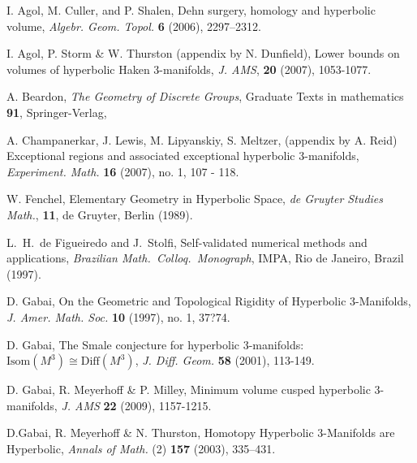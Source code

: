 \def\bibline{\hbox to30pt{\hrulefill}}

\begin{thebibliography}{GHMTY}


 I. Agol, M. Culler, and P. Shalen, Dehn surgery, homology and hyperbolic volume,
\textit {Algebr. Geom. Topol.} \textbf {6} (2006), 2297--2312.

 I. Agol, P. Storm \& W. Thurston (appendix by N. Dunfield), Lower bounds on volumes of hyperbolic Haken 3-manifolds, \textit {J. AMS}, \textbf {20} (2007), 1053-1077. 

  A. Beardon, \textit {The Geometry of Discrete Groups}, Graduate Texts in mathematics \textbf {91}, Springer-Verlag, 



 A. Champanerkar, J.  Lewis, M. Lipyanskiy, S. Meltzer, (appendix by A. Reid)
Exceptional regions and associated exceptional hyperbolic 3-manifolds, \textit {Experiment. Math.} \textbf {16} (2007), no. 1, 107 - 118.

  W. Fenchel,  Elementary Geometry in Hyperbolic Space, \textit {de Gruyter Studies Math.}, \textbf {11}, de Gruyter, Berlin (1989).


 L.\ H.\ de Figueiredo and J.\ Stolfi, Self-validated
numerical methods and applications, \textit {Brazilian Math.\  Colloq.\  Monograph}, IMPA, Rio de Janeiro, Brazil (1997).

 
  
 

 D. Gabai, On the Geometric and Topological Rigidity of Hyperbolic 3-Manifolds, \textit {J. Amer. Math. Soc.\/}  \textbf {10} (1997), no. 1, 37?74.

 D. Gabai, The Smale conjecture for hyperbolic 3-manifolds:  $\mathrm {Isom}(M^3) \cong \mathrm{Diff} (M^3)$, \textit {J. Diff. Geom.}  \textbf {58} (2001), 113-149.


 D. Gabai, R. Meyerhoff \& P. Milley, Minimum volume cusped hyperbolic 3-manifolds, \textit {J. AMS} \textbf {22} (2009), 1157-1215.

 D.Gabai, R. Meyerhoff \& N. Thurston, Homotopy Hyperbolic 3-Manifolds are Hyperbolic, \textit {Annals of Math.} (2) \textbf {157} (2003), 335--431.


\end{thebibliography}
